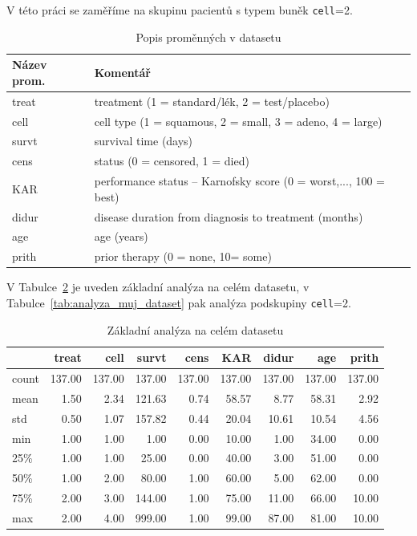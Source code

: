 \documentclass[a4, 11pt]{article}
\theoremstyle{definition}
\theoremstyle{remark}
\begin{document}
	V této práci se zaměříme na skupinu pacientů s typem buněk \texttt{cell}=2. 
	
\begin{table}[H]
	\centering
	\begin{tabular}{@{}ll@{}}
		\toprule
		Název prom. & Komentář                    \\ 
		\midrule
		treat & treatment (1 = standard/lék, 2 = test/placebo)                    \\
		cell  & cell type (1 = squamous, 2 = small, 3 = adeno, 4 = large)         \\
		survt & survival time   (days)                                          \\
		cens  & status (0 = censored, 1 = died)                                 \\
		KAR   & performance status -- Karnofsky score (0 = worst,..., 100 = best) \\
		didur & disease duration from diagnosis to treatment (months)           \\
		age   & age (years)                                                     \\
		prith & prior therapy (0 = none, 10= some)                             \\
		\bottomrule
	\end{tabular}
	\caption{Popis proměnných v datasetu}
	\label{tab:promenne_popis}
\end{table}

V Tabulce~\ref{tab:zaklad_anal_cely_dataset} je uveden základní analýza na celém datasetu, v Tabulce~\ref{tab:analyza_muj_dataset} pak analýza podskupiny \texttt{cell}=2.

\begin{table}[H]
	\centering
	\begin{tabular}{lrrrrrrrr}
		\toprule
		& treat & cell & survt & cens & KAR & didur & age & prith \\
		\midrule
		count & 137.00 & 137.00 & 137.00 & 137.00 & 137.00 & 137.00 & 137.00 & 137.00 \\
		mean & 1.50 & 2.34 & 121.63 & 0.74 & 58.57 & 8.77 & 58.31 & 2.92 \\
		std & 0.50 & 1.07 & 157.82 & 0.44 & 20.04 & 10.61 & 10.54 & 4.56 \\
		min & 1.00 & 1.00 & 1.00 & 0.00 & 10.00 & 1.00 & 34.00 & 0.00 \\
		25\% & 1.00 & 1.00 & 25.00 & 0.00 & 40.00 & 3.00 & 51.00 & 0.00 \\
		50\% & 1.00 & 2.00 & 80.00 & 1.00 & 60.00 & 5.00 & 62.00 & 0.00 \\
		75\% & 2.00 & 3.00 & 144.00 & 1.00 & 75.00 & 11.00 & 66.00 & 10.00 \\
		max & 2.00 & 4.00 & 999.00 & 1.00 & 99.00 & 87.00 & 81.00 & 10.00 \\
		\bottomrule
	\end{tabular}
	\caption{Základní analýza na celém datasetu} \label{tab:zaklad_anal_cely_dataset}
\end{table}
\end{document}
